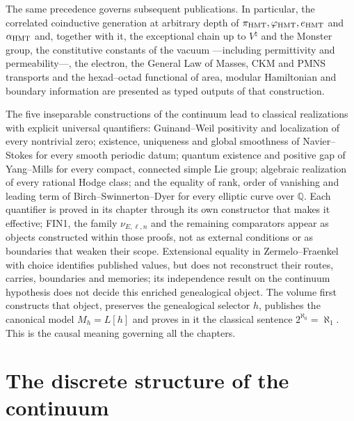 The same precedence governs subsequent publications. In particular,
the correlated coinductive generation at arbitrary depth of
\(\pi_{\rm HMT},\varphi_{\rm HMT},e_{\rm HMT}\) and
\(\alpha_{\rm HMT}\)
and, together with it, the exceptional chain up to \(V^\natural\) and the Monster
group, the constitutive constants of the vacuum ---including permittivity and
permeability---, the electron, the General Law of Masses, CKM and
PMNS transports and the hexad--octad functional of area, modular Hamiltonian and boundary
information are presented as typed outputs of that construction.

The five inseparable constructions of the continuum lead to classical
realizations with explicit universal quantifiers: Guinand--Weil
positivity and localization of every nontrivial zero; existence, uniqueness and
global smoothness of Navier--Stokes for every smooth periodic datum; quantum
existence and positive gap of Yang--Mills for every compact,
connected simple Lie group; algebraic realization of every rational Hodge class; and
the equality of rank, order of vanishing and leading term of
Birch--Swinnerton--Dyer for every elliptic curve over \(\mathbb Q\). Each
quantifier is proved in its chapter through its own constructor that
makes it effective; FIN1, the family \(\nu_{E,\ell,n}\) and the remaining
comparators appear as objects constructed within those proofs, not
as external conditions or as boundaries that weaken their scope. Extensional equality
in Zermelo--Fraenkel with choice identifies published values,
but does not reconstruct their routes, carries, boundaries and memories; its independence
result on the continuum hypothesis does not decide this enriched
genealogical object. The volume first constructs that object, preserves the
genealogical selector \(h\), publishes the canonical model \(M_h=L[h]\) and proves
in it the classical sentence \(2^{\aleph_0}=\aleph_1\). This is the causal
meaning governing all the chapters.

\section*{The discrete structure of the continuum}

